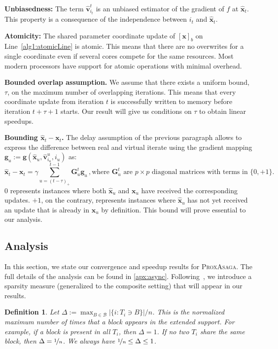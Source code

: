\documentclass{article}
\newcommand{\PASAGA}{\textsc{ProxAsaga}}
\def\xx{{\boldsymbol x}}
\def\vv{{\boldsymbol v}}
\newtheorem{definition}{Definition}
\begin{document}
{\bfseries Unbiasedness:} The term $\hat \vv^t_{i_t}$ is an unbiased estimator of the gradient of $f$ at $\hat \xx_t$.
This property is a consequence of the independence between $i_t$ and $\hat{\xx}_t$.

{\bfseries Atomicity:} The shared parameter coordinate update of $[\xx]_b$ on Line~\ref{alg1:atomicLine} is atomic.
This means that there are no overwrites for a single coordinate even if several cores compete for the same resources. Most modern processors have support for atomic operations with minimal overhead.

{\bfseries Bounded overlap assumption.} We assume that there exists a uniform bound, $\tau$, on the maximum number of overlapping iterations.
This means that every coordinate update from iteration $t$ is successfully written to memory before iteration $t + \tau + 1$ starts.
Our result will give us conditions on $\tau$ to obtain linear speedups.

{\bfseries Bounding $\hat \xx_t - \xx_t$.}
The delay assumption of the previous paragraph allows to express the difference between real and virtual iterate using the gradient mapping  $\boldsymbol g_u := \boldsymbol g(\hat{\xx}_u, \hat\vv^u_{i_u}, {i_u})$ as:
\begin{equation}
\hat \xx_t - \xx_t = \gamma \textstyle\sum_{u=(t - \tau)_+}^{t-1}\boldsymbol G_{u}^t \boldsymbol g_u \,, \text{where $\boldsymbol G^t_{u}$ are $p\times p$ diagonal matrices with terms in $\{0, +1\}$.}
\end{equation}
$0$ represents instances where both $\hat \xx_u$ and $\xx_u$ have received the corresponding updates.
$+1$, on the contrary, represents instances where $\hat \xx_u$ has not yet received an update that is already in $\xx_u$ by definition. This bound will prove essential to our analysis.

\subsection{Analysis}\label{ssec:analysis}
In this section, we state our convergence and speedup results for \PASAGA.
The full details of the analysis can be found in \ref{apx:async}.
Following~\citet{hogwild2011}, we introduce a sparsity measure (generalized to the composite setting) that will appear in our results.
\begin{definition}
	Let $\Delta := \max_{B \in \mathcal{B}} |\{i: T_i \ni B\}| / n$.
	This is the normalized maximum number of times that a block appears in the extended support. For example, if a block is present in all $T_i$, then $\Delta=1$. If no two $T_i$ share the same block, then $\Delta = \nicefrac{1}{n}$. We always have $\nicefrac{1}{n} \leq \Delta \leq 1$.
\end{definition}
\end{document}
